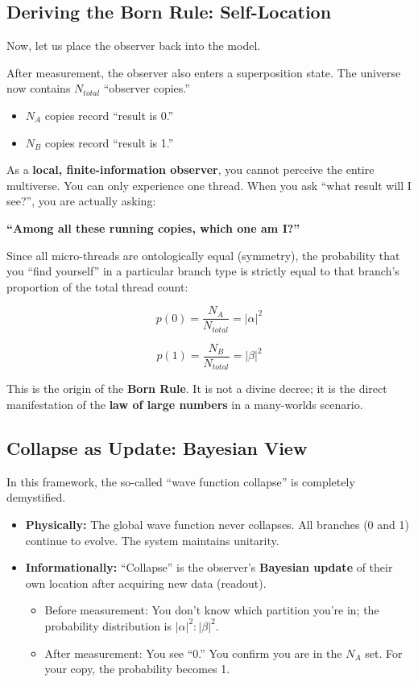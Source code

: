 \documentclass[11pt,a4paper,twoside]{book}
\begin{document}
\subsection{Deriving the Born Rule: Self-Location}

Now, let us place the observer back into the model.

After measurement, the observer also enters a superposition state. The universe now contains \textbf{$N_{total}$} ``observer copies.''

\begin{itemize}
\item \textbf{$N_A$} copies record ``result is 0.''

\item \textbf{$N_B$} copies record ``result is 1.''
\end{itemize}

As a \textbf{local, finite-information observer}, you cannot perceive the entire multiverse. You can only experience one thread. When you ask ``what result will I see?'', you are actually asking:

\textbf{``Among all these running copies, which one am I?''}

Since all micro-threads are ontologically equal (symmetry), the probability that you ``find yourself'' in a particular branch type is strictly equal to that branch's proportion of the total thread count:

$$p(0) = \frac{N_A}{N_{total}} = |\alpha|^2$$

$$p(1) = \frac{N_B}{N_{total}} = |\beta|^2$$

This is the origin of the \textbf{Born Rule}. It is not a divine decree; it is the direct manifestation of the \textbf{law of large numbers} in a many-worlds scenario.

\subsection{Collapse as Update: Bayesian View}

In this framework, the so-called ``wave function collapse'' is completely demystified.

\begin{itemize}
\item \textbf{Physically:} The global wave function never collapses. All branches (0 and 1) continue to evolve. The system maintains unitarity.

\item \textbf{Informationally:} ``Collapse'' is the observer's \textbf{Bayesian update} of their own location after acquiring new data (readout).

    \begin{itemize}
    \item Before measurement: You don't know which partition you're in; the probability distribution is \textbf{$|\alpha|^2 : |\beta|^2$}.

    \item After measurement: You see ``0.'' You confirm you are in the \textbf{$N_A$} set. For your copy, the probability becomes 1.
    \end{itemize}
\end{itemize}
\end{document}
